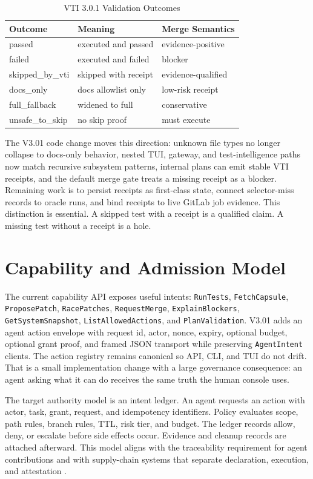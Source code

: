 \documentclass[conference]{IEEEtran}
\begin{document}
\begin{table}[t]
\caption{VTI 3.0.1 Validation Outcomes}
\centering
\begin{tabular}{lll}
\toprule
Outcome & Meaning & Merge Semantics\\
\midrule
passed & executed and passed & evidence-positive\\
failed & executed and failed & blocker\\
skipped\_by\_vti & skipped with receipt & evidence-qualified\\
docs\_only & docs allowlist only & low-risk receipt\\
full\_fallback & widened to full & conservative\\
unsafe\_to\_skip & no skip proof & must execute\\
\bottomrule
\end{tabular}
\end{table}

The V3.01 code change moves this direction: unknown file types no longer collapse to docs-only behavior, nested TUI, gateway, and test-intelligence paths now match recursive subsystem patterns, internal plans can emit stable VTI receipts, and the default merge gate treats a missing receipt as a blocker. Remaining work is to persist receipts as first-class state, connect selector-miss records to oracle runs, and bind receipts to live GitLab job evidence. This distinction is essential. A skipped test with a receipt is a qualified claim. A missing test without a receipt is a hole.

\section{Capability and Admission Model}
The current capability API exposes useful intents: \texttt{RunTests}, \texttt{FetchCapsule}, \texttt{ProposePatch}, \texttt{RacePatches}, \texttt{RequestMerge}, \texttt{ExplainBlockers}, \texttt{GetSystemSnapshot}, \texttt{ListAllowedActions}, and \texttt{PlanValidation}. V3.01 adds an agent action envelope with request id, actor, nonce, expiry, optional budget, optional grant proof, and framed JSON transport while preserving  \texttt{AgentIntent} clients. The action registry remains canonical so API, CLI, and TUI do not drift. That is a small implementation change with a large governance consequence: an agent asking what it can do receives the same truth the human console uses.

The target authority model is an intent ledger. An agent requests an action with actor, task, grant, request, and idempotency identifiers. Policy evaluates scope, path rules, branch rules, TTL, risk tier, and budget. The ledger records allow, deny, or escalate before side effects occur. Evidence and cleanup records are attached afterward. This model aligns with the traceability requirement for agent contributions \cite{software-agents-traceability} and with supply-chain systems that separate declaration, execution, and attestation \cite{slsa,in-toto,sigstore}.
\end{document}
